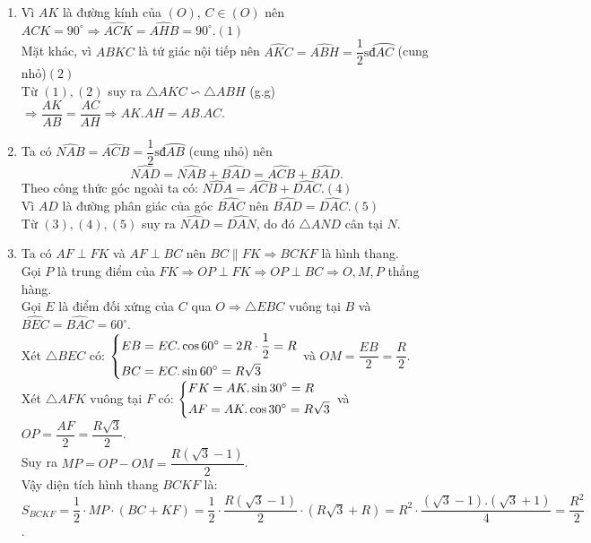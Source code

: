 \begin{ex}
{\begin{enumerate}[1.]
\begin{center}
    	\end{center}
    	\item Vì $AK$ là đường kính của $(O)$, $C\in (O)$ nên $\widehat{ACK}=90^\circ\Rightarrow\widehat{ACK}=\widehat{AHB}=90^\circ$.\hfill$(1)$\\
Mặt khác, vì $ABKC$ là tứ giác nội tiếp nên $\widehat{AKC}=\widehat{ABH}=\dfrac{1}{2}\text{sđ}\wideparen{AC}$ (cung nhỏ)\hfill$(2)$\\
Từ $(1),(2)$ suy ra $\triangle AKC \backsim \triangle ABH$ (g.g) $\Rightarrow \dfrac{AK}{AB}=\dfrac{AC}{AH}\Rightarrow AK.AH=AB.AC.$
    	 \item Ta có $\widehat{NAB}=\widehat{ACB}=\dfrac{1}{2}\text{sđ}\wideparen{AB}$ (cung nhỏ) nên \[\widehat{NAD}=\widehat{NAB}+\widehat{BAD}=\widehat{ACB}+\widehat{BAD}.\tag{3}\]
    	 Theo công thức góc ngoài ta có: $\widehat{NDA}=\widehat{ACB}+\widehat{DAC}$.\hfill$(4)$\\  
 Vì $AD$ là đường phân giác của góc $\widehat{BAC}$ nên $\widehat{BAD}=\widehat{DAC}$.\hfill$(5)$\\
    	 Từ $(3),(4),(5)$ suy ra $\widehat{NAD}=\widehat{DAN}$, do đó $\triangle AND$ cân tại $N$.
    	  \item Ta có $AF\perp FK$ và $AF\perp BC$ nên $BC\parallel FK\Rightarrow BCKF$ là hình thang.\\
    	  Gọi $P$ là trung điểm của $FK\Rightarrow OP\perp FK\Rightarrow OP \perp BC \Rightarrow O,M,P$ thẳng hàng.\\
    	  Gọi $E$ là điểm đối xứng của $C$ qua $O\Rightarrow \triangle EBC$ vuông tại $B$ và $\widehat{BEC}=\widehat{BAC}=60^\circ$.\\
    	  Xét $\triangle BEC$ có: $\left\{\begin{aligned}&EB=EC.\cos60^\circ=2R\cdot \dfrac{1}{2}=R\\&BC=EC.\sin60^\circ=R\sqrt{3}\end{aligned}\right.$ và $OM=\dfrac{EB}{2}=\dfrac{R}{2}.$\\ 
    	   Xét $\triangle AFK$ vuông tại $F$ có: $\left\{\begin{aligned}&FK=AK.\sin30^\circ=R\\&AF=AK.\cos30^\circ=R\sqrt{3}\end{aligned}\right.$ và $OP=\dfrac{AF}{2}=\dfrac{R\sqrt{3}}{2}.$\\
    	   Suy ra $MP=OP-OM=\dfrac{R(\sqrt{3}-1)}{2}$.\\
    	   Vậy diện tích hình thang $BCKF$ là:\\  $S_{BCKF}=\dfrac{1}{2}\cdot MP \cdot (BC+KF)=\dfrac{1}{2}\cdot \dfrac{R(\sqrt{3}-1)}{2} \cdot (R\sqrt{3}+R)=R^2 \cdot \dfrac{(\sqrt{3}-1).(\sqrt{3}+1)}{4}=\dfrac{R^2}{2}$.
    \end{enumerate}
    }
\end{ex}
